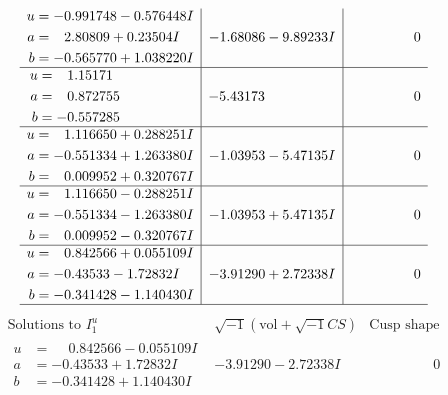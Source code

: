 \documentclass[1p]{elsarticle_modified}
\theoremstyle{definition}
\newcommand{\I}{\sqrt{-1}}
\begin{document}
$$\begin{array}{c|c|c}
\begin{aligned}
u &= -0.991748 - 0.576448 I \\
a &= \phantom{-}2.80809 + 0.23504 I \\
b &= -0.565770 + 1.038220 I\end{aligned}
 & -1.68086 - 9.89233 I & \phantom{-0.000000 } 0 \\ \hline\begin{aligned}
u &= \phantom{-}1.15171\phantom{ +0.000000I} \\
a &= \phantom{-}0.872755\phantom{ +0.000000I} \\
b &= -0.557285\phantom{ +0.000000I}\end{aligned}
 & -5.43173\phantom{ +0.000000I} & \phantom{-0.000000 } 0 \\ \hline\begin{aligned}
u &= \phantom{-}1.116650 + 0.288251 I \\
a &= -0.551334 + 1.263380 I \\
b &= \phantom{-}0.009952 + 0.320767 I\end{aligned}
 & -1.03953 - 5.47135 I & \phantom{-0.000000 } 0 \\ \hline\begin{aligned}
u &= \phantom{-}1.116650 - 0.288251 I \\
a &= -0.551334 - 1.263380 I \\
b &= \phantom{-}0.009952 - 0.320767 I\end{aligned}
 & -1.03953 + 5.47135 I & \phantom{-0.000000 } 0 \\ \hline\begin{aligned}
u &= \phantom{-}0.842566 + 0.055109 I \\
a &= -0.43533 - 1.72832 I \\
b &= -0.341428 - 1.140430 I\end{aligned}
 & -3.91290 + 2.72338 I & \phantom{-0.000000 } 0\\
 \hline 
 \end{array}$$\newpage$$\begin{array}{c|c|c}  
\text{Solutions to }I^u_{1}& \I (\text{vol} + \sqrt{-1}CS) & \text{Cusp shape}\\
 \hline 
\begin{aligned}
u &= \phantom{-}0.842566 - 0.055109 I \\
a &= -0.43533 + 1.72832 I \\
b &= -0.341428 + 1.140430 I\end{aligned}
 & -3.91290 - 2.72338 I & \phantom{-0.000000 } 0 \\ \hline\begin{aligned}

\end{aligned}
\end{array}$$
\end{document}

